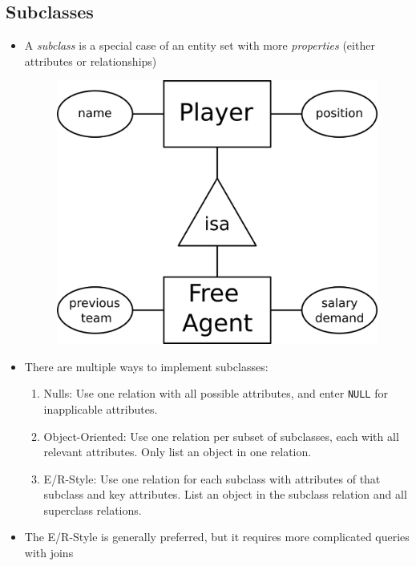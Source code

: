\documentclass[a4paper]{article}
\begin{document}
\subsection{Subclasses}
\begin{itemize}
\item A \emph{subclass} is a special case of an entity set with more \emph{properties} (either attributes or relationships)
\begin{figure}[H]
\centering
\includegraphics[width=0.3\linewidth]{entity12.png}
\end{figure}
\item There are multiple ways to implement subclasses:
\begin{enumerate}[label=(\roman*)]
\item Nulls: Use one relation with all possible attributes, and enter \lstinline|NULL| for inapplicable attributes.
\item Object-Oriented: Use one relation per subset of subclasses, each with all relevant attributes. Only list an object in one relation.
\item E/R-Style: Use one relation for each subclass with attributes of that subclass and key attributes. List an object in the subclass relation and all superclass relations.
\end{enumerate}
\item The E/R-Style is generally preferred, but it requires more complicated queries with joins


\end{itemize}
\end{document}
